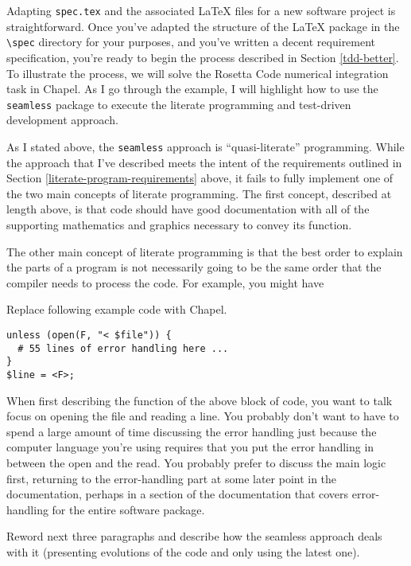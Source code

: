 Adapting \lstinline{spec.tex} and the associated \LaTeX\xspace files for a new software project is straightforward. 
Once you've adapted the structure of the \LaTeX\xspace package in the \lstinline{\spec} directory for your
purposes, and you've written a decent requirement specification, you're ready to begin the process described in
Section \ref{tdd-better}. 
To illustrate the process, we will solve the Rosetta Code numerical integration 
task\cite{rosetta-code-numerical-integration} in Chapel. As I go through the example, I will highlight
how to use the \lstinline{seamless} package to execute the literate programming and test-driven development
approach.

As I stated above, the \lstinline{seamless} approach is ``quasi-literate'' programming.  While the approach
that I've described meets the intent of the requirements outlined in Section 
\ref{literate-program-requirements} above, it fails to fully implement one of the two main concepts of
literate programming.\cite{knuth}
The first concept, described at length above, is that code should have good documentation with all of the
supporting mathematics and graphics necessary to convey its function.

The other main concept of literate programming is that the best order to explain the parts of a program 
is not necessarily going to be the same order that the compiler needs to process the code. 
For example, you might have

\begin{TODO}
Replace following example code with Chapel.
\end{TODO}
\begin{verbatim}
unless (open(F, "< $file")) {
  # 55 lines of error handling here ...        
}
$line = <F>;
\end{verbatim}

When first describing the function of the above block of code, you want to talk focus on opening the file 
and reading a line. You probably don't want to have to spend a large amount of time discussing the error handling 
just because the computer language you're using requires that you put the error handling in between the 
open and the read. You probably prefer to discuss the main logic first, returning to the error-handling 
part at some later point in the documentation, perhaps in a section of the documentation that covers error-handling
for the entire software package.

\begin{TODO}
Reword next three paragraphs and describe how the seamless approach deals with it (presenting evolutions of the
code and only using the latest one).
\end{TODO}

